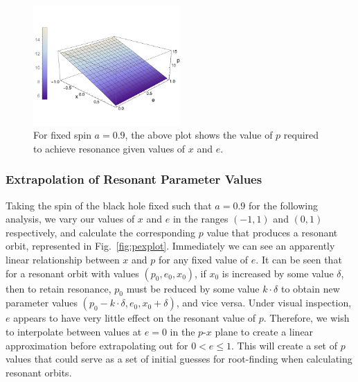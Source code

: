 \begin{figure}
    \centering
    \includegraphics[width=0.5\textwidth]{images/pexplot.pdf}
    \caption[Plot of $p$-$e$-$x$ plane for resonant parameter values]{For fixed spin $a=0.9$, the above plot shows the value of $p$ required to achieve resonance given values of $x$ and $e$.}
    \label{fig:pexplot}
\end{figure}

\subsubsection{Extrapolation of Resonant Parameter Values}
Taking the spin of the black hole fixed such that $a=0.9$ for the following analysis, we vary our values of $x$ and $e$ in the ranges $(-1,1)$ and $(0,1)$ respectively, and calculate the corresponding $p$ value that produces a resonant orbit, represented in Fig.~\eqref{fig:pexplot}.
Immediately we can see an apparently linear relationship between $x$ and $p$ for any fixed value of $e$.
It can be seen that for a resonant orbit with values $(p_0,e_0,x_0)$, if $x_0$ is increased by some value $\delta$, then to retain resonance, $p_0$ must be reduced by some value $k\cdot\delta$ to obtain new parameter values $(p_0-k\cdot\delta,e_0,x_0+\delta)$, and vice versa.
Under visual inspection, $e$ appears to have very little effect on the resonant value of $p$.
Therefore, we wish to interpolate between values at $e=0$ in the $p$-$x$ plane to create a linear approximation before extrapolating out for $0<e\leq 1$.
This will create a set of $p$ values that could serve as a set of initial guesses for root-finding when calculating resonant orbits.

